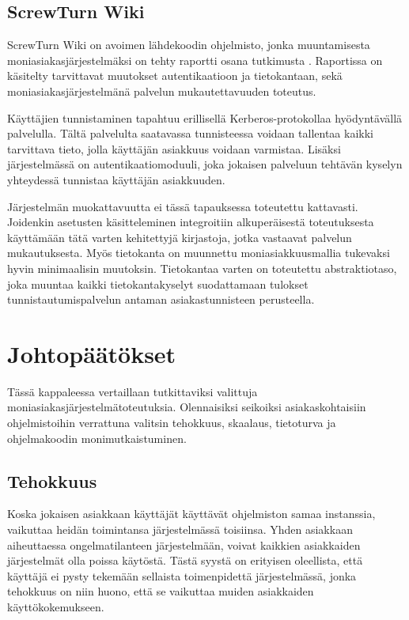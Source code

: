\section{ScrewTurn Wiki}
ScrewTurn Wiki on avoimen lähdekoodin ohjelmisto, jonka muuntamisesta moniasiakasjärjestelmäksi on tehty raportti osana tutkimusta \cite{bezemer2010challenges}. Raportissa on käsitelty tarvittavat muutokset autentikaatioon ja tietokantaan, sekä moniasiakasjärjestelmänä palvelun mukautettavuuden toteutus.

Käyttäjien tunnistaminen tapahtuu erillisellä Kerberos-protokollaa hyödyntävällä palvelulla. Tältä palvelulta saatavassa tunnisteessa voidaan tallentaa kaikki tarvittava tieto, jolla käyttäjän asiakkuus voidaan varmistaa. Lisäksi järjestelmässä on autentikaatiomoduuli, joka jokaisen palveluun tehtävän kyselyn yhteydessä tunnistaa käyttäjän asiakkuuden.

Järjestelmän muokattavuutta ei tässä tapauksessa toteutettu kattavasti. Joidenkin asetusten käsitteleminen integroitiin alkuperäisestä toteutuksesta käyttämään tätä varten kehitettyjä kirjastoja, jotka vastaavat palvelun mukautuksesta. Myös tietokanta on muunnettu moniasiakkuusmallia tukevaksi hyvin minimaalisin muutoksin. Tietokantaa varten on toteutettu abstraktiotaso, joka muuntaa kaikki tietokantakyselyt suodattamaan tulokset tunnistautumispalvelun antaman asiakastunnisteen perusteella.



\chapter{Johtopäätökset}

Tässä kappaleessa vertaillaan tutkittaviksi valittuja moniasiakasjärjestelmätoteutuksia. Olennaisiksi seikoiksi asiakaskohtaisiin ohjelmistoihin verrattuna valitsin tehokkuus, skaalaus, tietoturva ja ohjelmakoodin monimutkaistuminen. 

\section{Tehokkuus}
Koska jokaisen asiakkaan käyttäjät käyttävät ohjelmiston samaa instanssia, vaikuttaa heidän toimintansa järjestelmässä toisiinsa. Yhden asiakkaan aiheuttaessa ongelmatilanteen järjestelmään, voivat kaikkien asiakkaiden järjestelmät olla poissa käytöstä. Tästä syystä on erityisen oleellista, että käyttäjä ei pysty tekemään sellaista toimenpidettä järjestelmässä, jonka tehokkuus on niin huono, että se vaikuttaa muiden asiakkaiden käyttökokemukseen.

